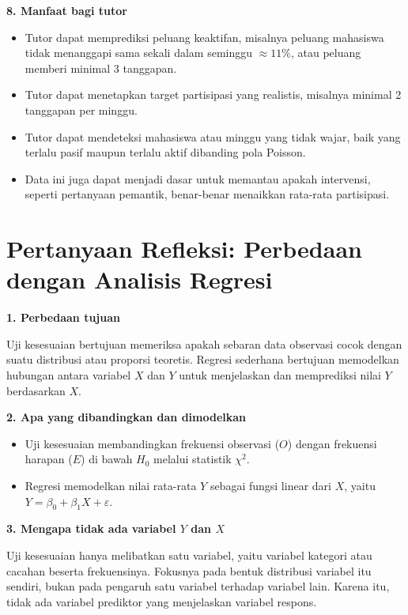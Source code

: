 \documentclass[11pt,a4paper]{article}
\newcommand{\soal}[1]{\par\Needspace{6\baselineskip}\medskip\textbf{#1}\par}
\newcommand{\chisq}{\chi^2}
\begin{document}
\soal{8. Manfaat bagi tutor}
\begin{itemize}
  \item Tutor dapat memprediksi peluang keaktifan, misalnya peluang mahasiswa tidak menanggapi sama sekali dalam seminggu $\approx 11\%$, atau peluang memberi minimal 3 tanggapan.
  \item Tutor dapat menetapkan target partisipasi yang realistis, misalnya minimal 2 tanggapan per minggu.
  \item Tutor dapat mendeteksi mahasiswa atau minggu yang tidak wajar, baik yang terlalu pasif maupun terlalu aktif dibanding pola Poisson.
  \item Data ini juga dapat menjadi dasar untuk memantau apakah intervensi, seperti pertanyaan pemantik, benar-benar menaikkan rata-rata partisipasi.
\end{itemize}

\section{Pertanyaan Refleksi: Perbedaan dengan Analisis Regresi}

\soal{1. Perbedaan tujuan}
Uji kesesuaian bertujuan memeriksa apakah sebaran data observasi cocok dengan suatu distribusi atau proporsi teoretis. Regresi sederhana bertujuan memodelkan hubungan antara variabel $X$ dan $Y$ untuk menjelaskan dan memprediksi nilai $Y$ berdasarkan $X$.

\soal{2. Apa yang dibandingkan dan dimodelkan}
\begin{itemize}
  \item Uji kesesuaian membandingkan frekuensi observasi ($O$) dengan frekuensi harapan ($E$) di bawah $H_0$ melalui statistik $\chisq$.
  \item Regresi memodelkan nilai rata-rata $Y$ sebagai fungsi linear dari $X$, yaitu $Y = \beta_0 + \beta_1 X + \varepsilon$.
\end{itemize}

\soal{3. Mengapa tidak ada variabel $Y$ dan $X$}
Uji kesesuaian hanya melibatkan satu variabel, yaitu variabel kategori atau cacahan beserta frekuensinya. Fokusnya pada bentuk distribusi variabel itu sendiri, bukan pada pengaruh satu variabel terhadap variabel lain. Karena itu, tidak ada variabel prediktor yang menjelaskan variabel respons.
\end{document}
